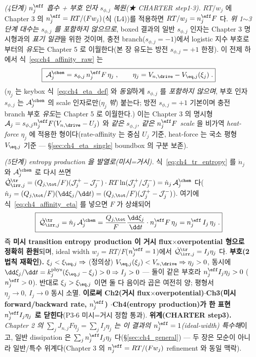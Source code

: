 \begin{verifybox}
\emph{(4단계) $n_j^{\eff}$ 흡수 + 부호 인자 $s_{\phi,j}$ 복원(★ CHARTER step1$\cdot$3).} $RT/w_j$ 에 Chapter 3 의
$n_j^{\eff}=RT/(Fw_j)$(식 (L4))를 적용하면 $RT/w_j=n_j^{\eff}F$ 다. \emph{위 1$\sim$3단계 대수는 $s_{\phi,j}$ 를
포함하지 않으므로}, boxed 결과의 일반 $s_{\phi,j}$ 인자는 Chapter 3 명시형과의 \emph{표기 일관}을 위한 것이며,
충전 branch($s_{\phi,j}=-1$)에서 logistic 지수 부호로부터의 \emph{유도}는 Chapter 5 로 이월한다(본 장 유도는 방전
$s_{\phi,j}=+1$ 한정). 이 전제 하에서 식~\eqref{eq:ch4_affinity_raw} 는
\begin{equation}
\boxed{\;\mathcal A_j^{\chem}=s_{\phi,j}\,n_j^{\eff}F\,\eta_j\;,\qquad
\eta_j=V_{n,\drive}-V_{\eq,j}(\xi_j)\;.}
\label{eq:ch4_affinity_eta}
\end{equation}
($\eta_j$ 는 keybox 식~\eqref{eq:ch4_eta_def} 와 \emph{동일}하게 $s_{\phi,j}$ 를 \emph{포함하지 않으며}, 부호
인자 $s_{\phi,j}$ 는 $\mathcal A_j^{\chem}$ 의 scale 인자로만($\eta_j$ \emph{밖}) 붙는다; 방전 $s_{\phi,j}=+1$
기본이며 충전 branch 부호 \emph{유도}는 Chapter 5 로 이월한다.)
이는 Chapter 3 의 명시형 $\mathcal A_j=s_{\phi,j}n_j^{\eff}F(V_{n,\drive}-U_j)$ 와 \emph{같은 $s_{\phi,j}$,
같은 $n_j^{\eff}F$ scale} 을 비가역 \emph{heat-force} $\eta_j$ 에 적용한 형이다(rate-affinity 는 중심 $U_j$
기준, heat-force 는 국소 평형 $V_{\eq,j}$ 기준 — \S\ref{sec:ch4_eta_single} boundbox 의 구분 보존).

\emph{(5단계) entropy production 을 발열로(미시=거시).} 식~\eqref{eq:ch4_tr_entropy} 를 $\dot n_j$ 와
$\mathcal A_j^{\chem}$ 로 다시 쓰면 $\dot{\mathcal Q}_{\irr,j}^{\tr}=(Q_{j,\tot}/F)(\mathcal J_j^+-\mathcal J_j^-)
\cdot RT\ln(\mathcal J_j^+/\mathcal J_j^-)=\dot n_j\,\mathcal A_j^{\chem}$ 다($\dot n_j=(Q_{j,\tot}/F)(\dd\xi_j/\dd t)
=(Q_{j,\tot}/F)(\mathcal J_j^+-\mathcal J_j^-)$). 여기에 식~\eqref{eq:ch4_affinity_eta} 를 넣으면 $F$ 가 상쇄되어
\begin{equation}
\boxed{\;\dot{\mathcal Q}_{\irr,j}^{\tr}=\dot n_j\,\mathcal A_j^{\chem}
=\frac{Q_{j,\tot}}{F}\frac{\dd\xi_j}{\dd t}\cdot n_j^{\eff}F\,\eta_j
=n_j^{\eff}\,I_j\,\eta_j\;.}
\label{eq:ch4_micro_macro}
\end{equation}
즉 \textbf{미시 transition entropy production 이 거시 flux$\times$overpotential 형으로 정확히 환원}되며, ideal
width $w_j=RT/F$($n_j^{\eff}=1$)에서 $\dot{\mathcal Q}_{\irr,j}^{\tr}=I_j\eta_j$ 다. \textbf{부호(2법칙
재확인).} $\xi_j<\xi_{\eq,j}\Rightarrow$ (정의상) $V_{\eq,j}(\xi_j)<V_{n,\drive}\Rightarrow\eta_j>0$, 동시에
$\dd\xi_j/\dd t=k_j^{\mathrm{phys}}(\xi_{\eq,j}-\xi_j)>0\Rightarrow I_j>0$ — 둘이 같은 부호라 $n_j^{\eff}I_j\eta_j>0$
($n_j^{\eff}>0$). 반대로 $\xi_j>\xi_{\eq,j}$ 이면 둘 다 음이라 곱은 여전히 양; 평형서 $\eta_j\to0,\ I_j\to0$
동시 소멸. \textbf{이로써 Ch2(거시 flux$\times$overpotential)$\cdot$Ch3(미시 forward/backward rate, $n_j^{\eff}$)
$\cdot$Ch4(entropy production)가 한 표현 $n_j^{\eff}I_j\eta_j$ 로 닫힌다}(P3-6 미시=거시 정합 통과).
\textbf{위계(CHARTER step3).} \emph{Chapter 2 의 $\sum_j J_{n,j}F\eta_j=\sum_j I_j\eta_j$ 는 이 결과의
$n_j^{\eff}=1$(ideal-width) 특수해}이고, 일반 dissipation 은 $\sum_j n_j^{\eff}I_j\eta_j$ 다(\S\ref{sec:ch4_general})
— 두 장은 모순이 아니라 일반/특수 위계다(Chapter 3 의 $n_j^{\eff}=RT/(Fw_j)$ refinement 와 동일 맥락).
\end{verifybox}

